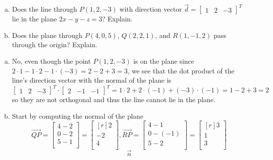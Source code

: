 \documentclass[../main.tex]{subfiles}
\begin{document}
\begin{enumerate}[a)]
	\item Does the line through $P(1, 2, -3)$ with direction vector $\vec{d} = \begin{bmatrix}1&2&-3\end{bmatrix}^T$ lie in the plane $2x - y - z = 3$? Explain.
	\item Does the plane through $P(4, 0, 5)$, $Q(2, 2, 1)$, and $R(1, -1, 2)$ pass through the origin? Explain.
\end{enumerate}

\solution
\begin{enumerate}[a)]
	\item No, even though the point $P(1, 2, -3)$ is on the plane since $2\cdot1 - 1\cdot2 - 1\cdot(-3) = 2 - 2 + 3 = 3$, we see that the dot product of the line's direction vector with the normal of the plane is
		\[
			\begin{bmatrix}1&2&-3\end{bmatrix}^T
			\cdot
			\begin{bmatrix}2&-1&-1\end{bmatrix}^T
			=
			1\cdot2 + 2\cdot(-1) + (-3)\cdot(-1)
			=
			1 - 2 + 3
			=
			2
		\]
		so they are not orthogonal and thus the line cannot lie in the plane.
	\item Start by computing the normal of the plane
		\[
			\overrightarrow{QP}
			=
			\begin{bmatrix}
				4 - 2 \\
				0 - 2 \\
				5 - 1 \\
			\end{bmatrix}
			=
			\begin{bmatrix*}[r]
				2 \\
				-2 \\
				4 \\
			\end{bmatrix*}
			,
			\overrightarrow{RP}
			=
			\begin{bmatrix}
				4 - 1 \\
				0 - (-1) \\
				5 - 2 \\
			\end{bmatrix}
			=
			\begin{bmatrix*}[r]
				3 \\
				1 \\
				3 \\
			\end{bmatrix*}
		\]
		\[
			\vec{n}
\]
\end{enumerate}
\end{document}
